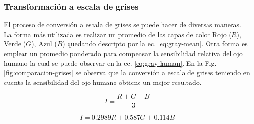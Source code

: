 \subsubsection{Transformación a escala de grises}

El proceso de conversión a escala de grises se puede hacer de diversas maneras. La forma más utilizada es realizar un promedio de las capas de color Rojo ($R$), Verde ($G$), Azul ($B$) quedando descripto por la ec. \ref{eq:gray-mean}.
Otra forma es emplear un promedio ponderado para compensar la sensibilidad relativa del ojo humano la cual se puede observar en la ec. \ref{eq:gray-human}. En la Fig. \ref{fig:comparacion-grises} se observa que la conversión a escala de grises teniendo en cuenta la sensibilidad del ojo humano obtiene un mejor resultado.

\begin{equation}
    \label{eq:gray-mean}
    I = \frac{R + G + B}{3}
\end{equation}

\begin{equation}
    \label{eq:gray-human}
    I = 0.2989R + 0.587G + 0.114B
\end{equation}

